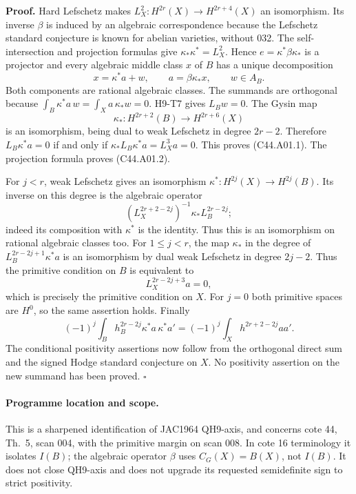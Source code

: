\documentclass[11pt]{article}
\theoremstyle{remark}\newtheorem{remark}[theorem]{Remark}
\begin{document}
\textbf{Proof.}
Hard Lefschetz makes $L_X^2:H^{2r}(X)\longrightarrow H^{2r+4}(X)$
an isomorphism. Its inverse $\beta$ is induced by an algebraic
correspondence because the Lefschetz standard conjecture is known
for abelian varieties, without 032. The self-intersection and
projection formulas give
$\kappa_*\kappa^*=L_X^2$. Hence
$e=\kappa^*\beta\kappa_*$ is a projector and every algebraic middle
class $x$ of $B$ has a unique decomposition
\[
 x=\kappa^*a+w,\qquad a=\beta\kappa_*x,\qquad w\in A_B.       \tag{C44.A01.3}
\]
Both components are rational algebraic classes. The summands are
orthogonal because
$\int_B\kappa^*a\,w=\int_Xa\,\kappa_*w=0$.
H9-T7 gives $L_Bw=0$. The Gysin map
\[
 \kappa_*:H^{2r+2}(B)\longrightarrow H^{2r+6}(X)
\]
is an isomorphism, being dual to weak Lefschetz in degree $2r-2$.
Therefore $L_B\kappa^*a=0$ if and only if
$\kappa_*L_B\kappa^*a=L_X^3a=0$. This proves (C44.A01.1).
The projection formula proves (C44.A01.2).

For $j<r$, weak Lefschetz gives an isomorphism
$\kappa^*:H^{2j}(X)\longrightarrow H^{2j}(B)$.
Its inverse on this degree is the algebraic operator
\[
 (L_X^{2r+2-2j})^{-1}\kappa_*L_B^{2r-2j};                   \tag{C44.A01.4}
\]
indeed its composition with $\kappa^*$ is the identity.
Thus this is an isomorphism on rational algebraic classes too.
For $1\le j<r$, the map $\kappa_*$ in the degree of
$L_B^{2r-2j+1}\kappa^*a$ is an isomorphism by dual weak
Lefschetz in degree $2j-2$. Thus the primitive condition on $B$
is equivalent to
\[
 L_X^{2r-2j+3}a=0,
\]
which is precisely the primitive condition on $X$. For $j=0$
both primitive spaces are $H^0$, so the same assertion holds.
Finally
\[
 (-1)^j\int_B h_B^{2r-2j}\kappa^*a\,\kappa^*a'
 =(-1)^j\int_Xh^{2r+2-2j}aa'.
\]
The conditional positivity assertions now follow from the
orthogonal direct sum and the signed Hodge standard conjecture on
$X$. No positivity assertion on the new summand has been proved.
\hfill$\square$

\paragraph{Programme location and scope.}
This is a sharpened identification of JAC1964 QH9-axis, and concerns
cote 44, Th.~5, scan 004, with the primitive margin on scan 008.
In cote 16 terminology it isolates $I(B)$; the algebraic operator
$\beta$ uses $C_G(X)=B(X)$, not $I(B)$. It does not close
QH9-axis and does not upgrade its requested semidefinite sign to
strict positivity.
\end{document}
